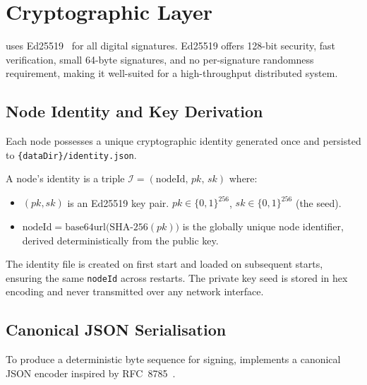 \section{Cryptographic Layer}
\label{sec:crypto}

\pebble{} uses Ed25519~\cite{bernstein2012ed25519,rfc8032} for all digital
signatures. Ed25519 offers 128-bit security, fast verification, small 64-byte
signatures, and no per-signature randomness requirement, making it well-suited
for a high-throughput distributed system.

\subsection{Node Identity and Key Derivation}

Each node possesses a unique cryptographic identity generated once and persisted
to \texttt{\{dataDir\}/identity.json}.

\begin{definition}
A node's identity is a triple $\mathcal{I} = (\mathrm{nodeId},\, pk,\, sk)$
where:
\begin{itemize}[leftmargin=1.5em]
  \item $(pk, sk)$ is an Ed25519 key pair. $pk \in \{0,1\}^{256}$,
        $sk \in \{0,1\}^{256}$ (the seed).
  \item $\mathrm{nodeId} = \mathrm{base64url}\bigl(\mathrm{SHA\text{-}256}(pk)\bigr)$
        is the globally unique node identifier, derived deterministically from the
        public key.
\end{itemize}
\end{definition}

The identity file is created on first start and loaded on subsequent starts,
ensuring the same \texttt{nodeId} across restarts. The private key seed is
stored in hex encoding and never transmitted over any network interface.

\subsection{Canonical JSON Serialisation}

To produce a deterministic byte sequence for signing, \pebble{} implements a
canonical JSON encoder inspired by RFC~8785~\cite{rfc8785}.

